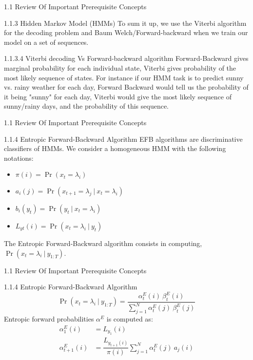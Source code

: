 \documentclass{beamer}
\providecommand{\pr}[1]{\ensuremath{\Pr\left(#1\right)}}
\begin{document}
\begin{frame}{1.1 Review Of Important Prerequisite Concepts}
\begin{block}{1.1.3 Hidden Markov Model (HMMs)}
    To sum it up, we use the Viterbi algorithm for the decoding problem and Baum Welch/Forward-backward when we train our model on a set of sequences.
    \begin{block}{1.1.3.4 Viterbi decoding Vs Forward-backward algorithm}
    Forward-Backward gives marginal probability for each individual state, Viterbi gives probability of the most likely sequence of states. For instance if our HMM task is to predict sunny vs. rainy weather for each day, Forward Backward would tell us the probability of it being "sunny" for each day, Viterbi would give the most likely sequence of sunny/rainy days, and the probability of this sequence.
    \end{block}
     \end{block}
\end{frame}
\begin{frame}{1.1 Review Of Important Prerequisite Concepts}
\begin{block}{1.1.4 Entropic Forward-Backward Algorithm}
EFB algorithms are discriminative classifiers of HMMs. We consider a homogeneous HMM with the following notations:
\begin{itemize}
    \item $\pi(i) = \pr{x_t = \lambda_i}$
    \item $a_i(j) = \pr{x_{t+1} = \lambda_j\ |\ x_t = \lambda_i}$
    \item $b_i(y_t) = \pr{y_t\ |\ x_t = \lambda_i}$
    \item $L_{yt}(i) = \pr{x_t = \lambda_i\ |\ y_t}$
\end{itemize}
The Entropic Forward-Backward algorithm consists in computing, $\pr{x_t = \lambda_i\ |\ y_{1:T}}$.
\end{block} 
\end{frame}
\begin{frame}{1.1 Review Of Important Prerequisite Concepts}
\begin{block}{1.1.4 Entropic Forward-Backward Algorithm}
\begin{equation}
    \pr{x_t = \lambda_i\ |\ y_{1:T}} = \dfrac{\alpha_{t}^{E}(i)\ \beta_{t}^{E}(i)}{\sum_{j=1}^{N}\alpha_{t}^{E}(j)\ \beta_{t}^{E}(j)}
\end{equation}
Entropic forward probabilities $\alpha^E$ is computed as:
\begin{equation}
\begin{split}
    \alpha_{1}^{E}(i) &= L_{y_1}(i)\\
    \alpha_{t+1}^{E}(i) &= \dfrac{L_{y_{t+1}(i)}}{\pi(i)} \sum_{j=1}^{N}\alpha_{t}^{E}(j)\ a_j(i)
\end{split}
\end{equation}
\end{block} 
\end{frame}
\end{document}
